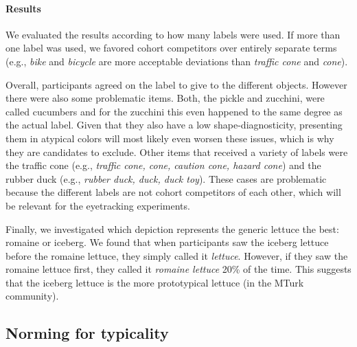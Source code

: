 \documentclass[a4paper,man,floatsintext,natbib,donotrepeattitle]{apa6}
\begin{document}
\paragraph{Results}
We evaluated the results according to how many labels were used. If more than one label was used, we favored cohort competitors over entirely separate terms (e.g., \textit{bike} and \textit{bicycle} are more acceptable deviations than \textit{traffic cone} and \textit{cone}).

Overall, participants agreed on the label to give to the different objects. However there were also some problematic items. Both, the pickle and zucchini, were called cucumbers and for the zucchini this even happened to the same degree as the actual label. Given that they also have a low shape-diagnosticity, presenting them in atypical colors will most likely even worsen these issues, which is why they are candidates to exclude. Other items that received a variety of labels were the traffic cone (e.g., \textit{traffic cone, cone, caution cone, hazard cone}) and the rubber duck (e.g., \textit{rubber duck, duck, duck toy}). These cases are problematic because the different labels are not cohort competitors of each other, which will be relevant for the eyetracking experiments. 

Finally, we investigated which depiction represents the generic lettuce the best: romaine or iceberg. We found that when participants saw the iceberg lettuce before the romaine lettuce, they simply called it \textit{lettuce}. However, if they saw the romaine lettuce first, they called it \textit{romaine lettuce} 20\% of the time. This suggests that the iceberg lettuce is the more prototypical lettuce (in the MTurk community). 


\subsection{Norming for typicality}
\label{typicalitynorming}





\end{document}
